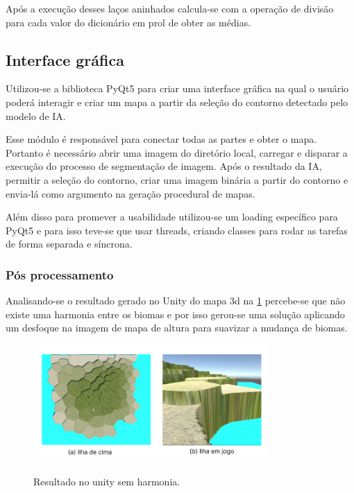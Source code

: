 Após a execução desses laços aninhados calcula-se com a operação de divisão para cada valor do dicionário em prol de obter as médias.


\subsection{Interface gráfica}

Utilizou-se a biblioteca PyQt5 para criar uma interface gráfica na qual o usuário poderá interagir e criar um mapa a partir da seleção do contorno detectado pelo modelo de IA.

Esse módulo é responsável para conectar todas as partes e obter o mapa. Portanto é necessário abrir uma imagem do diretório local, carregar e disparar a execução do processo de segmentação de imagem. Após o resultado da IA, permitir a seleção do contorno,  criar uma imagem binária a partir do contorno e envia-lá como argumento na geração procedural de mapas.

Além disso para promever a usabilidade utilizou-se um loading específico para PyQt5 e para isso teve-se que usar threads, criando classes para rodar as tarefas de forma separada e síncrona.

\subsubsection{Pós processamento}
Analisando-se o resultado gerado no Unity do mapa 3d na \cref{fig:unity_init} percebe-se que não existe uma harmonia entre os biomas e por isso gerou-se uma solução aplicando um desfoque na imagem de mapa de altura para suavizar a mudança de biomas.

\begin{figure}[!ht]
	\centering
    \caption{Resultado no unity sem harmonia.}
	\includegraphics[width=0.8\textwidth]{figures/unity_entry.png}
	\label{fig:unity_init}
\end{figure}

